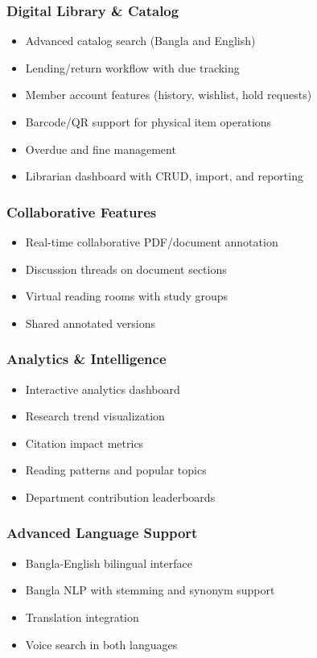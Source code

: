 \documentclass[12pt,a4paper]{report}
\begin{document}
\subsubsection{Digital Library \& Catalog}
\begin{itemize}
    \item Advanced catalog search (Bangla and English)
    \item Lending/return workflow with due tracking
    \item Member account features (history, wishlist, hold requests)
    \item Barcode/QR support for physical item operations
    \item Overdue and fine management
    \item Librarian dashboard with CRUD, import, and reporting
\end{itemize}

\subsubsection{Collaborative Features}
\begin{itemize}
    \item Real-time collaborative PDF/document annotation
    \item Discussion threads on document sections
    \item Virtual reading rooms with study groups
    \item Shared annotated versions
\end{itemize}

\subsubsection{Analytics \& Intelligence}
\begin{itemize}
    \item Interactive analytics dashboard
    \item Research trend visualization
    \item Citation impact metrics
    \item Reading patterns and popular topics
    \item Department contribution leaderboards
\end{itemize}

\subsubsection{Advanced Language Support}
\begin{itemize}
    \item Bangla-English bilingual interface
    \item Bangla NLP with stemming and synonym support
    \item Translation integration
    \item Voice search in both languages
\end{itemize}
\end{document}
